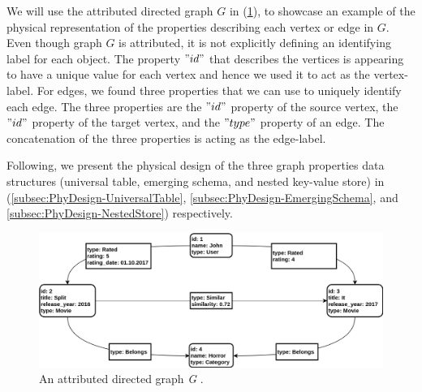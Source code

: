 {We will use the attributed directed graph $G$ in (\ref{fig:PropertyGraph_physical}), to showcase an example of the physical representation of the properties describing each vertex or edge in $G$. Even though graph $G$ is attributed, it is not explicitly defining an identifying label for each object. The property $"id"$ that describes the vertices is appearing to have a unique value for each vertex and hence we used it to act as the vertex-label. For edges, we found three properties that we can use to uniquely identify each edge. The three properties are the $"id"$ property of the source vertex, the $"id"$ property of the target vertex, and the $"type"$ property of an edge. The concatenation of the three properties is acting as the edge-label.

Following, we present the physical design of the three graph properties data structures (universal table, emerging schema, and nested key-value store) in (\ref{subsec:PhyDesign-UniversalTable}, \ref{subsec:PhyDesign-EmergingSchema}, and \ref{subsec:PhyDesign-NestedStore}) respectively.




\begin{figure}[H]
\centering
\includegraphics[width=1\textwidth]{pics/PropertyGraph.png}
\caption{An attributed directed graph \textit{G} \cite{DBLP:journals/corr/ParadiesLB14}.}
\label{fig:PropertyGraph_physical}
\end{figure} 







}
